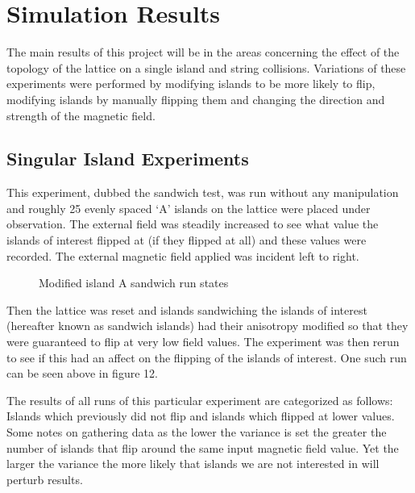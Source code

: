 \section{Simulation Results}
The main results of this project will be in the areas concerning the effect of the topology of the lattice on a single island and string collisions.  Variations of these experiments were performed by modifying islands to be more likely to flip, modifying islands by manually flipping them and changing the direction and strength of the magnetic field.
\subsection{Singular Island Experiments}
This experiment, dubbed the sandwich test, was run without any manipulation and roughly 25 evenly spaced `A' islands on the lattice were placed under observation.  The external field was steadily increased to see what value the islands of interest flipped at (if they flipped at all) and these values were recorded.  The external magnetic field applied was incident left to right.
\par
\begin{figure}[ht!]
    \begin{center}
\qquad
        \caption[Modified island A sandwich run states]{Modified island A sandwich run states}
        \label{fig:gf11}
    \end{center}
\end{figure}
Then the lattice was reset and islands sandwiching the islands of interest (hereafter known as sandwich islands) had their anisotropy modified so that they were guaranteed to flip at very low field values.  The experiment was then rerun to see if this had an affect on the flipping of the islands of interest.  One such run can be seen above in figure 12.
\par
The results of all runs of this particular experiment are categorized as follows: Islands which previously did not flip and islands which flipped at lower values.  Some notes on gathering data as the lower the variance is set the greater the number of islands that flip around the same input magnetic field value.  Yet the larger the variance the more likely that islands we are not interested in will perturb results.
